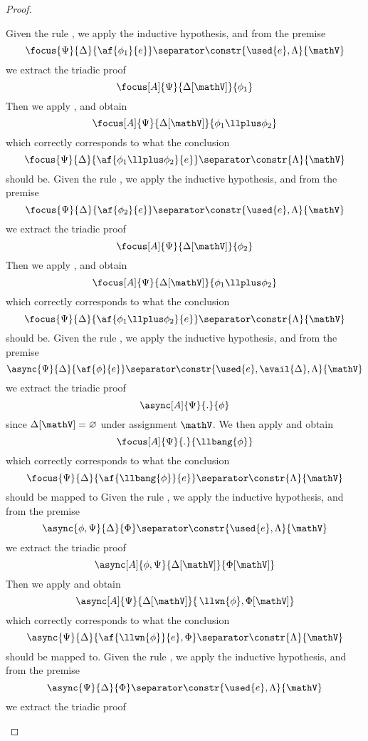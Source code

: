 \begin{proof}
\begin{itemize}
		\indCase{\displayplus[L]} Given the rule \derRule{\displayplus[L]}, we apply the inductive hypothesis, and from the premise
			$$ \focus{\Psi}{\Delta}{\af{\phi_1}{e}} \separator \constr{\used{e}, \Lambda}{\mathV}$$
			we extract the triadic proof
			$$ \focus[A]{\Psi}{\Delta[\mathV]}{\phi_1} $$
			Then we apply \derRule[A]{\displayplus[L]}, and obtain
			$$ \focus[A]{\Psi}{\Delta[\mathV]}{\phi_1 \llplus \phi_2} $$
			which correctly corresponds to what the conclusion
			$$ \focus{\Psi}{\Delta}{\af{\phi_1 \llplus \phi_2}{e}} \separator \constr{\Lambda}{\mathV} $$
			should be.
		\indCase{\displayplus[R]} Given the rule \derRule{\displayplus[R]}, we apply the inductive hypothesis, and from the premise
			$$ \focus{\Psi}{\Delta}{\af{\phi_2}{e}} \separator \constr{\used{e}, \Lambda}{\mathV}$$
			we extract the triadic proof
			$$ \focus[A]{\Psi}{\Delta[\mathV]}{\phi_2} $$
			Then we apply \derRule[A]{\displayplus[R]}, and obtain
			$$ \focus[A]{\Psi}{\Delta[\mathV]}{\phi_1 \llplus \phi_2} $$
			which correctly corresponds to what the conclusion
			$$ \focus{\Psi}{\Delta}{\af{\phi_1 \llplus \phi_2}{e}} \separator \constr{\Lambda}{\mathV} $$
			should be.
		\indCase{\displaybang} Given the rule \derRule{\displaybang}, we apply the inductive hypothesis, and from the premise
			$$ \async{\Psi}{\Delta}{\af{\phi}{e}} \separator \constr{\used{e}, \avail{\Delta}, \Lambda}{\mathV} $$
			we extract the triadic proof
			$$ \async[A]{\Psi}{.}{\phi} $$
			since $\Delta[\mathV] = \varnothing$ under assignment $\mathV$.
			We then apply \derRule[A]{\displaybang} and obtain
			$$ \focus[A]{\Psi}{.}{\llbang{\phi}} $$
			which correctly corresponds to what the conclusion 
			$$ \focus{\Psi}{\Delta}{\af{\llbang{\phi}}{e}} \separator \constr{\Lambda}{\mathV} $$
			should be mapped to
		\indCase{\displaywn} Given the rule \derRule{\displaywn}, we apply the inductive hypothesis, and from the premise
			$$ \async{\phi, \Psi}{\Delta}{\Phi} \separator \constr{\used{e}, \Lambda}{\mathV} $$
			we extract the triadic proof
			$$ \async[A]{\phi, \Psi}{\Delta[\mathV]}{\Phi[\mathV]}$$
			Then we apply \derRule[A]{\displaywn} and obtain
			$$ \async[A]{\Psi}{\Delta[\mathV]}{\,\llwn{\phi}, \Phi[\mathV]} $$
			which correctly corresponds to what the conclusion
			$$ \async{\Psi}{\Delta}{\af{\llwn{\phi}}{e}, \Phi} \separator \constr{\Lambda}{\mathV} $$
			should be mapped to.
		\indCase{\displaybot} Given the rule \derRule{\displaybot}, we apply the inductive hypothesis, and from the premise
			$$ \async{\Psi}{\Delta}{\Phi} \separator \constr{\used{e}, \Lambda}{\mathV} $$
			we extract the triadic proof

\end{itemize}
\end{proof}
